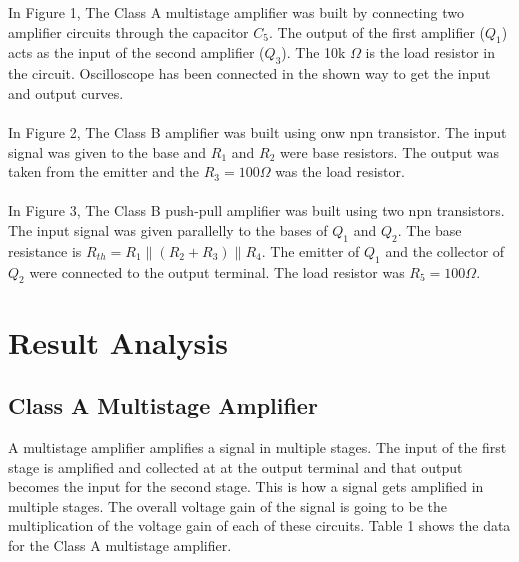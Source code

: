 \documentclass[12pt]{article}
\begin{document}
In Figure 1, The Class A multistage amplifier was built by connecting two amplifier circuits through the capacitor $C_5$. The output of the first amplifier ($Q_1$) acts as the input of the second amplifier ($Q_3$). The 10k $\Omega$ is the load resistor in the circuit. Oscilloscope has been connected in the shown way to get the input and output curves. \\~\\

In Figure 2, The Class B amplifier was built using onw npn transistor. The input signal was given to the base and $R_1$ and $R_2$ were base resistors. The output was taken from the emitter and the $R_3 = 100 \Omega$ was the load resistor. \\~\\

In Figure 3, The Class B push-pull amplifier was built using two npn transistors. The input signal was given parallelly to the bases of $Q_1$ and $Q_2$. The base resistance is $R_{th} = R_1 \| (R_2 + R_3) \| R_4$. The emitter of $Q_1$ and the collector of $Q_2$ were connected to the output terminal. The load resistor was $R_5 = 100 \Omega$.

\newpage
\section{Result Analysis}

\subsection{Class A Multistage Amplifier}
A multistage amplifier amplifies a signal in multiple stages. The input of the first stage is amplified and collected at at the output terminal and that output becomes the input for the second stage. This is how a signal gets amplified in multiple stages. The overall voltage gain of the signal is going to be the multiplication of the voltage gain of each of these circuits. Table 1 shows the data for the Class A multistage amplifier.
\end{document}
